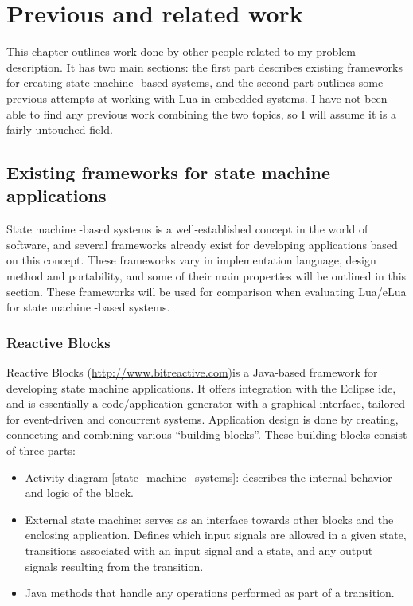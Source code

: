 \chapter{Previous and related work}
\label{ch:related_work}
This chapter outlines work done by other people related to my problem description. It has two main sections: the first part describes existing frameworks for creating state machine -based systems, and the second part outlines some previous attempts at working with Lua in embedded systems. I have not been able to find any previous work combining the two topics, so I will assume it is a fairly untouched field.

\section{Existing frameworks for state machine applications}
\label{sec:existing_frameworks_state_machine}
State machine -based systems is a well-established concept in the world of software, and several frameworks already exist for developing applications based on this concept. These frameworks vary in implementation language, design method and portability, and some of their main properties will be outlined in this section. These frameworks will be used for comparison when evaluating Lua/eLua for state machine -based systems.

\subsection{Reactive Blocks}
\label{sec:reactive_blocks}
Reactive Blocks (\url{http://www.bitreactive.com})is a Java-based framework for developing state machine applications. It offers integration with the Eclipse \gls{ide}, and is essentially a code/application generator with a graphical interface, tailored for event-driven and concurrent systems. Application design is done by creating, connecting and combining various “building blocks”. These building blocks consist of three parts:
\begin{itemize}
	\item Activity diagram \ref{state_machine_systems}: describes the internal behavior and logic of the block.
	\item External state machine: serves as an interface towards other blocks and the enclosing application. Defines which input signals are allowed in a given state, transitions associated with an input signal and a state, and any output signals resulting from the transition.
	\item Java methods that handle any operations performed as part of a transition.
\end{itemize}

